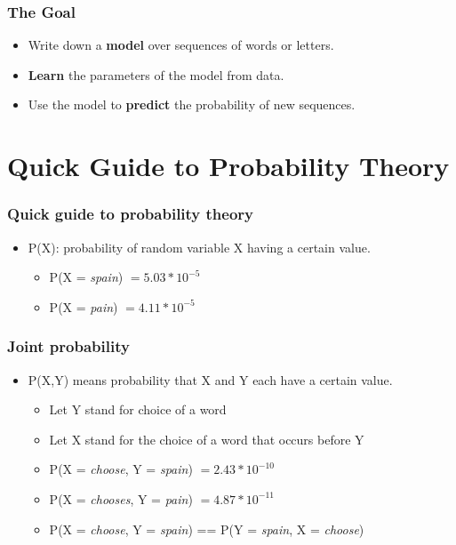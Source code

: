 \documentclass[handout]{beamer}
\begin{document}
\begin{frame}
\frametitle{The Goal}
\begin{itemize}[<+->]
\item Write down a \textbf{model} over sequences of words or letters.
\item \textbf{Learn} the parameters of the model from data.
\item Use the model to \textbf{predict} the probability of new sequences.
\end{itemize}
\end{frame}

\section{Quick Guide to Probability Theory}
\frame{\tableofcontents[currentsection]}

\begin{frame}
\frametitle{Quick guide to probability theory}
\begin{itemize}[<+->]
\item P(X): probability of random variable X having a certain value.
\begin{itemize}[<+->]
\item P(X = \textit{spain}) $= 5.03 * 10^{-5}$
\item P(X = \textit{pain}) $= 4.11 * 10^{-5}$
\end{itemize}
\end{itemize}
\end{frame}

\begin{frame}
\frametitle{Joint probability}
\begin{itemize}[<+->]
\item P(X,Y) means probability that X and Y each have a certain value.
\begin{itemize}[<+->]
\item Let Y stand for choice of a word
\item Let X stand for the choice of a word that occurs before Y
\item P(X = \textit{choose}, Y = \textit{spain}) $= 2.43 * 10^{-10}$
\item P(X = \textit{chooses}, Y = \textit{pain}) $= 4.87 * 10^{-11}$
\item P(X = \textit{choose}, Y = \textit{spain}) == P(Y = \textit{spain}, X = \textit{choose})
\end{itemize}
\end{itemize}
\end{frame}
\end{document}
